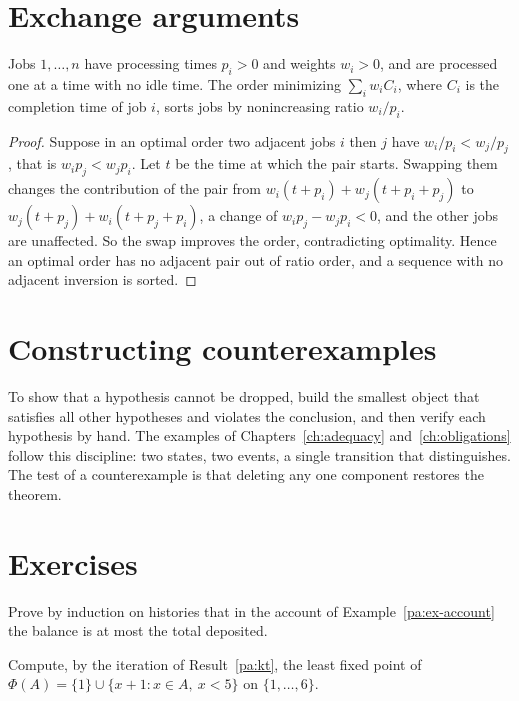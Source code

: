\section{Exchange arguments}

\begin{newresult}\label{pa:exchange}
Jobs $1,\dots,n$ have processing times $p_i>0$ and weights $w_i>0$, and are processed one at a time with no idle time. The order minimizing $\sum_iw_iC_i$, where $C_i$ is the completion time of job $i$, sorts jobs by nonincreasing ratio $w_i/p_i$.
\end{newresult}
\begin{proof}
Suppose in an optimal order two adjacent jobs $i$ then $j$ have $w_i/p_i<w_j/p_j$, that is $w_ip_j<w_jp_i$. Let $t$ be the time at which the pair starts. Swapping them changes the contribution of the pair from $w_i(t+p_i)+w_j(t+p_i+p_j)$ to $w_j(t+p_j)+w_i(t+p_j+p_i)$, a change of $w_ip_j-w_jp_i<0$, and the other jobs are unaffected. So the swap improves the order, contradicting optimality. Hence an optimal order has no adjacent pair out of ratio order, and a sequence with no adjacent inversion is sorted.
\end{proof}

\section{Constructing counterexamples}

To show that a hypothesis cannot be dropped, build the smallest object that satisfies all other hypotheses and violates the conclusion, and then verify each hypothesis by hand. The examples of Chapters~\ref{ch:adequacy} and~\ref{ch:obligations} follow this discipline: two states, two events, a single transition that distinguishes. The test of a counterexample is that deleting any one component restores the theorem.

\section*{Exercises}

\begin{exercise}
Prove by induction on histories that in the account of Example~\ref{pa:ex-account} the balance is at most the total deposited.
\end{exercise}

\begin{exercise}
Compute, by the iteration of Result~\ref{pa:kt}, the least fixed point of $\Phi(A)=\{1\}\cup\{x+1:x\in A,\ x<5\}$ on $\{1,\dots,6\}$.
\end{exercise}

